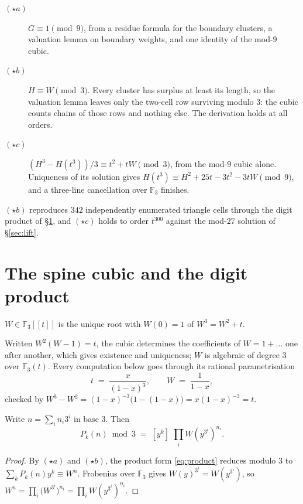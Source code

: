 \documentclass[11pt]{article}
\newcommand{\F}{\mathbb{F}}
\begin{document}
\begin{description}
\item[$(\star a)$] $G \equiv 1 \pmod 9$, from a residue formula for the boundary
  clusters, a valuation lemma on boundary weights, and one identity of the
  mod-$9$ cubic.
\item[$(\star b)$] $H \equiv W \pmod 3$. Every cluster has surplus at least its
  length, so the valuation lemma leaves only the two-cell row surviving modulo
  $3$: the cubic counts chains of those rows and nothing else. The derivation
  holds at all orders.
\item[$(\star c)$] $(H^3 - H(t^3))/3 \equiv t^2 + tW \pmod 3$, from the mod-$9$
  cubic alone. Uniqueness of its solution gives
  $H(t^3) \equiv H^2 + 25t - 3t^2 - 3tW \pmod 9$, and a three-line cancellation
  over $\F_3$ finishes.
\end{description}

$(\star b)$ reproduces $342$ independently enumerated triangle cells through the
digit product of \S\ref{sec:cubic}, and $(\star c)$ holds to order $t^{300}$
against the mod-$27$ solution of \S\ref{sec:lift}.

\section{The spine cubic and the digit product}
\label{sec:cubic}

\begin{definition}
$W \in \F_3[[t]]$ is the unique root with $W(0) = 1$ of $W^3 = W^2 + t$.
\end{definition}
Written $W^2(W-1) = t$, the cubic determines the coefficients of
$W = 1 + \dots$ one after another, which gives existence and uniqueness; $W$ is
algebraic of degree $3$ over $\F_3(t)$. Every computation below goes through its
rational parametrisation
\begin{equation}
  t \;=\; \frac{x}{(1-x)^3},
  \qquad
  W \;=\; \frac{1}{1-x} ,
  \label{eq:param}
\end{equation}
checked by $W^3 - W^2 = (1-x)^{-3}\bigl(1 - (1-x)\bigr) = x(1-x)^{-3} = t$.

\begin{theorem}
\label{thm:digit}
Write $n = \sum_i n_i 3^i$ in base $3$. Then
\[
  P_k(n) \bmod 3 \;=\; [y^k]\;\prod_i W\!\left(y^{3^i}\right)^{n_i}.
\]
\end{theorem}

\begin{proof}
By $(\star a)$ and $(\star b)$, the product form \eqref{eq:product} reduces modulo
$3$ to $\sum_k P_k(n)y^k \equiv W^n$. Frobenius over $\F_3$ gives
$W(y)^{3^i} = W(y^{3^i})$, so $W^n = \prod_i \bigl(W^{3^i}\bigr)^{n_i} =
\prod_i W(y^{3^i})^{n_i}$.
\end{proof}
\end{document}

